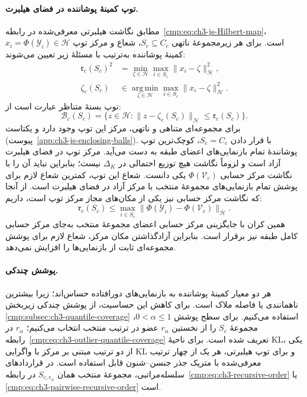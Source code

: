 \paragraph{توپ کمینهٔ پوشاننده در فضای هیلبرت.}
مطابق نگاشت هیلبرتی معرفی‌شده در
رابطه~\eqref{cmp:eq:ch3-js-Hilbert-map}،
$x_i=\Phi(\mathscr Y_i)\in\mathcal H$ است.
برای هر زیرمجموعهٔ ناتهی $S_c\subseteq C_c$،
شعاع و مرکز توپ کمینهٔ پوشاننده به‌ترتیب با
مسئلهٔ زیر تعیین می‌شوند:
\begin{equation}\label{cmp:eq:ch3-outlier-js-meb-primal}
\boxed{
\begin{aligned}
\mathfrak r_c(S_c)^2
&=\min_{\zeta\in\mathcal H}
\max_{i\in S_c}\|x_i-\zeta\|_{\mathcal H}^2,\\
\zeta_c(S_c)
&\in\operatorname*{arg\,min}_{\zeta\in\mathcal H}
\max_{i\in S_c}\|x_i-\zeta\|_{\mathcal H}^2.
\end{aligned}}
\end{equation}
توپ بستهٔ متناظر عبارت است از:
\begin{equation}\label{cmp:eq:ch3-meb-ball}
\mathcal B_c(S_c)=
\{z\in\mathcal H:
\|z-\zeta_c(S_c)\|_{\mathcal H}
\le\mathfrak r_c(S_c)\}.
\end{equation}
برای مجموعه‌ای متناهی و ناتهی، مرکز این توپ
وجود دارد و یکتاست (پیوست~\ref{app:ch3-js-enclosing-balls}).
با قرار دادن $S_c=C_c$، کوچک‌ترین توپ پوشانندهٔ
تمام بازنمایی‌های اعضای طبقه به دست می‌آید.
مرکز توپ در فضای هیلبرت آزاد است و لزوماً
نگاشت هیچ توزیع احتمالی در $\Delta_K$ نیست؛
بنابراین نباید آن را با نگاشت مرکز حسابی
$\Phi(\mathcal V_c)$ یکی دانست.
شعاع این توپ، کمترین شعاع لازم برای پوشش
تمام بازنمایی‌های مجموعهٔ منتخب با مرکز آزاد
در فضای هیلبرت است. از آنجا که نگاشت مرکز
حسابی نیز یکی از مکان‌های مجاز مرکز توپ است،
داریم:
\begin{equation}\label{cmp:eq:ch3-meb-fixed-radius-bound}
\mathfrak r_c(S_c)
\le
\max_{i\in S_c}
\|\Phi(\mathscr Y_i)-\Phi(\mathcal V_c)\|_{\mathcal H}.
\end{equation}
همین کران با جایگزینی مرکز حسابی اعضای مجموعهٔ
منتخب به‌جای مرکز حسابی کامل طبقه نیز برقرار
است. بنابراین آزادگذاشتن مکان مرکز، شعاع لازم
برای پوشش مجموعه‌ای ثابت از بازنمایی‌ها را
افزایش نمی‌دهد.

\paragraph{پوشش چندکی.}
هر دو معیار کمینهٔ پوشاننده به بازنمایی‌های دورافتاده
حساس‌اند؛ زیرا بیشترین ناهمانندی یا فاصله ملاک است.
برای کاهش این حساسیت، از پوشش چندکی زیربخش
\ref{cmp:subsec:ch3-quantile-coverage}
استفاده می‌کنیم. برای سطح پوشش $0<\alpha\le1$،
مجموعهٔ $S_c$ را از نخستین $r_\alpha$ عضو در ترتیب
منتخب انتخاب می‌کنیم؛ $r_\alpha$ در
رابطه~\eqref{cmp:eq:ch3-outlier-quantile-coverage}
تعریف شده است. برای ناحیهٔ KL، یکی از دو ترتیب
مبتنی بر مرکز با واگرایی KL و برای توپ هیلبرتی،
هر یک از چهار ترتیب معرفی‌شده با متریک جذر
جنسن--شنون قابل استفاده است. در قراردادهای
سلسله‌مراتبی، مجموعهٔ منتخب همان $S_{c,r_\alpha}$
در رابطه~\eqref{cmp:eq:ch3-recursive-order} یا
\eqref{cmp:eq:ch3-pairwise-recursive-order} است.

